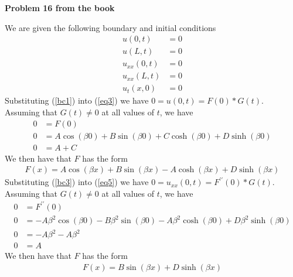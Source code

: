 \documentclass[12pt]{article}
\newcommand{\problem}[1]{\hspace{-4 ex} \large \textbf{Problem #1} }
\begin{document}
\problem{16 from the book}

	We are given the following boundary and initial conditions
	\begin{align}
		u(0,t) & = 0 \label{bc1} \\
		u(L,t) & = 0 \label{bc2} \\
		u_{xx}(0,t) & = 0 \label{bc3} \\
		u_{xx}(L,t) & = 0 \label{bc4} \\
		u_t(x,0) & = 0 \label{ic1}
	\end{align}
	Substituting (\ref{bc1}) into (\ref{eq3}) we have $0 = u(0,t) = F(0)*G(t)$. Assuming that $G(t) \neq 0$ at all values of $t$, we have
	\begin{align*}
		0 & = F(0) \\
		0 & = A \cos(\beta 0) + B \sin(\beta 0) + C \cosh(\beta 0) + D \sinh(\beta 0) \\
		0 & = A + C
	\end{align*}
	We then have that $F$ has the form
	\begin{align}
		F(x) = A \cos(\beta x) + B \sin(\beta x) - A \cosh(\beta x) + D \sinh(\beta x) \label{eq5}
	\end{align}
	Substituting (\ref{bc3}) into (\ref{eq5}) we have $0 = u_{xx}(0,t) = F^{\prime\prime}(0)*G(t)$. Assuming that $G(t) \neq 0$ at all values of $t$, we have
	\begin{align*}
		0 & = F^{\prime\prime}(0) \\
		0 & = -A \beta^2\cos(\beta 0) - B \beta^2 \sin(\beta 0) -A \beta^2 \cosh(\beta 0) + D \beta^2 \sinh(\beta 0) \\
		0 & = -A \beta^2 -A \beta^2 \\
		0 & = A
	\end{align*}
	We then have that $F$ has the form
	\begin{align}
		F(x) = B \sin(\beta x) + D \sinh(\beta x) \label{eq6}
	\end{align} 
	
\end{document}
